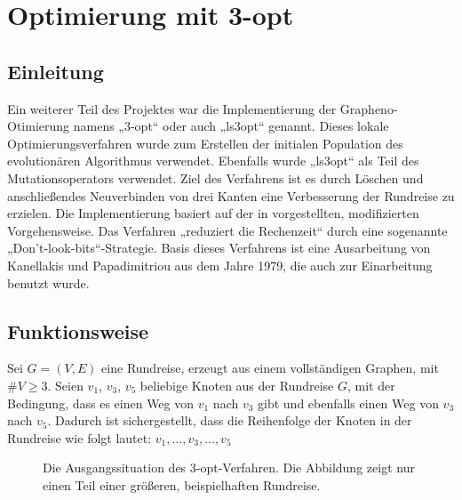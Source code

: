 \chapter{Optimierung mit 3-opt}
\section{Einleitung}
Ein weiterer Teil des Projektes war die Implementierung der
Grapheno-Otimierung namens „3-opt“ oder auch „ls3opt“ genannt. Dieses lokale 
Optimierungsverfahren wurde zum Erstellen der initialen Population des 
evolutionären Algorithmus verwendet. Ebenfalls wurde „ls3opt“ als Teil
des Mutationsoperators verwendet. Ziel des Verfahrens ist es durch 
Löschen und anschließendes Neuverbinden von drei Kanten eine Verbesserung der Rundreise zu erzielen. Die Implementierung basiert auf der in
\cite{nagata} vorgestellten, modifizierten Vorgehensweise. Das Verfahren „reduziert die Rechenzeit“\cite{gapx} durch
eine sogenannte „Don't-look-bits“-Strategie. Basis dieses Verfahrens ist
eine Ausarbeitung von Kanellakis und Papadimitriou\cite{ls3opt_atsp} aus dem Jahre 1979,
die auch zur Einarbeitung benutzt wurde. 

\section{Funktionsweise}
\label{ls3opt_func}
Sei $G = (V,E)$ eine Rundreise, erzeugt aus einem vollständigen Graphen,
mit $\#V \geq 3$.
Seien $v_1$, $v_3$, $v_5$ beliebige Knoten aus der Rundreise $G$, mit
der Bedingung, dass es einen Weg von $v_1$ nach $v_3$ gibt und ebenfalls
einen Weg von $v_3$ nach $v_5$. Dadurch ist sichergestellt, dass die
Reihenfolge der Knoten in der Rundreise wie folgt lautet: $v_1, \dotsc, v_3, \dotsc, v_5$
\begin{figure}[bh]
\centering
{}
\caption[Ausgangssituation 3-opt]{Die Ausgangssituation des
3-opt-Verfahren. Die Abbildung zeigt nur einen Teil einer größeren,
  beispielhaften Rundreise.}
\end {figure}

